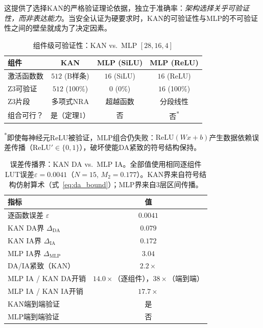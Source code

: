 \documentclass[journal,onecolumn]{IEEEtran}
\theoremstyle{definition}
\theoremstyle{plain}
\theoremstyle{remark}
\begin{document}
这提供了选择KAN的严格验证理论依据，独立于准确率：\textit{架构选择关乎可验证性，而非表达能力}。当安全认证为硬要求时，KAN的可验证性与MLP的不可验证性之间的壁垒就成为了决定因素。

\begin{table}[!t]
\centering
\caption{组件级可验证性：KAN vs.\ MLP $[28,16,4]$}
\label{tab:verify_gap_components}
\small
\begin{tabular}{@{}lccc@{}}
\toprule
\textbf{组件} & \textbf{KAN} & \textbf{MLP (SiLU)} & \textbf{MLP (ReLU)} \\
\midrule
  激活函数数  & $512$ (B样条) & $16$ (SiLU) & $16$ (ReLU) \\
  Z3可验证   & $512$ (100\%) & $0$ (0\%)   & $16$ (100\%) \\
  Z3片段     & 多项式NRA   & 超越函数    & 分段线性 \\
\midrule
  组合可行？ & 是（定理1）  & 否          & 否\textsuperscript{*} \\
\bottomrule
\end{tabular}
\vspace{4pt}
\noindent\textsuperscript{*}即使每神经元ReLU被验证，MLP组合仍失败：$\text{ReLU}(Wx+b)$产生数据依赖误差传播（$\text{ReLU}'\in\{0,1\}$），破坏使能DA紧致的符号结构保持。
\end{table}

\begin{table}[!t]
\centering
\caption{误差传播界：KAN DA vs.\ MLP IA。全部值使用相同逐组件LUT误差$\varepsilon = 0.0041$（$N{=}15$, $M_2{=}0.177$）。KAN界来自符号结构仿射算术（式~\ref{eq:da_bound}）；MLP界来自3层区间传播。}
\label{tab:verify_gap_propagation}
\small
\begin{tabular}{@{}lc@{}}
\toprule
\textbf{指标} & \textbf{值} \\
\midrule
  逐函数误差 $\varepsilon$            & $0.0041$ \\
  KAN DA界 $\Delta_{\text{DA}}$       & $0.079$ \\
  KAN IA界 $\Delta_{\text{IA}}$       & $0.172$ \\
  MLP IA界 $\Delta_{\text{MLP}}$      & $3.04$ \\
\midrule
  DA/IA紧致（KAN）                    & $2.2\times$ \\
  MLP IA / KAN DA开销                 & $14.0\times$（逐组件），$38\times$（端到端） \\
  MLP IA / KAN IA开销                 & $17.7\times$ \\
  KAN端到端验证                       & 是 \\
  MLP端到端验证                       & 否 \\
\bottomrule
\end{tabular}
\end{table}
\end{document}
